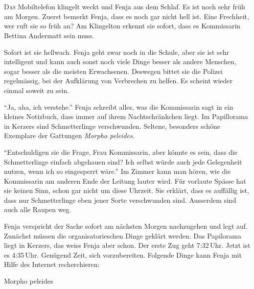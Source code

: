 \chapter*{}
\lettrine[lines=3]{\color{red}D}{as} Mobiltelefon klingelt weckt und Fenja aus dem Schlaf. Es ist noch sehr früh am Morgen. Zuerst bemerkt Fenja, dass es noch gar nicht hell ist. Eine Frechheit, wer ruft sie so früh an? Am Klingelton erkennt sie sofort, dass es Kommissarin Bettina Andermatt sein muss.

Sofort ist sie hellwach. Fenja geht zwar noch in die Schule, aber sie ist sehr intelligent und kann auch sonst noch viele Dinge besser als andere Menschen, sogar besser als die meisten Erwachsenen. Deswegen bittet sie die Polizei regelmässig, bei der Aufklärung von Verbrechen zu helfen. Es scheint wieder einmal soweit zu sein.

\enquote{Ja, aha, ich verstehe.} Fenja schreibt alles, was die Kommissarin sagt in ein kleines Notizbuch, dass immer auf ihrem Nachtschränkchen liegt. Im Papillorama in Kerzers sind Schmetterlinge verschwunden. Seltene, besonders schöne Exemplare der Gattungen \emph{Morpho peleides}.

\enquote{Entschuldigen sie die Frage, Frau Kommissarin, aber könnte es sein, dass die Schmetterlinge einfach abgehauen sind? Ich selbst würde auch jede Gelegenheit nutzen, wenn ich so eingesperrt wäre.} Im Zimmer kann man hören, wie die Kommissarin am anderen Ende der Leitung lauter wird. Für vorlaute Spässe hat sie keinen Sinn, schon gar nicht um diese Uhrzeit. Sie erklärt, dass es auffällig ist, dass nur Schmetterlinge eben jener Sorte verschwunden sind. Ausserdem sind auch alle Raupen weg.

Fenja verspricht der Sache sofort am nächsten Morgen nachzugehen und legt auf. Zunächst müssen die organisatorieschen Dinge geklärt werden. Das Papilorama liegt in Kerzers, das weiss Fenja aber schon. Der erste Zug geht 7:32\,Uhr. Jetzt ist es 4:35\,Uhr. Genügend Zeit, sich vorzubereiten. Folgende Dinge kann Fenja mit Hilfe des Internet recherchieren:

\begin{description}
	\item[Morpho peleides] 
\end{description}

